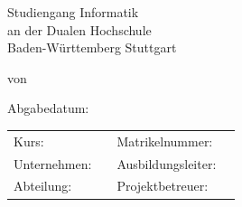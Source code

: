 \documentclass[12pt]{report}
\begin{document}
 
	
	\begin{titlepage}
		\thispagestyle{titlepage}
		\newcommand\HRule{\rule{\textwidth}{1pt}} %

		
		\begin{center}
			
			\vspace*{2cm}
			
			\begin{spacing}{2}
				{ \huge \bfseries \MakeUppercase{\meinTitel}}
			\end{spacing}
			
			\vspace*{1.5cm}
			
			\Large \artDerArbeit
			
			\vspace*{3cm}
			
			{\LARGE Studiengang Informatik}\\
			{\LARGE an der Dualen Hochschule}\\
			{\LARGE Baden-Württemberg Stuttgart}\\

			\vspace*{2.5cm}
			
			\Large von \meinName
			
			\vspace*{1.5cm}
			
			\Large Abgabedatum: \abgabeDatum
			

			\begin{table}[bp]
				\begin{tabular}{l l l l}
					Kurs: & \meinKurs & Matrikelnummer: & \meineMatrikelNr  \\
					Unternehmen: & \firmenName & Ausbildungsleiter: & \ausbildungsLeiter\\
					Abteilung: &  \abteilungsName & Projektbetreuer: &  \projektBetreuer\\
				\end{tabular}
			\end{table}
			
			
		\end{center}
		
	\end{titlepage}


\end{document}
